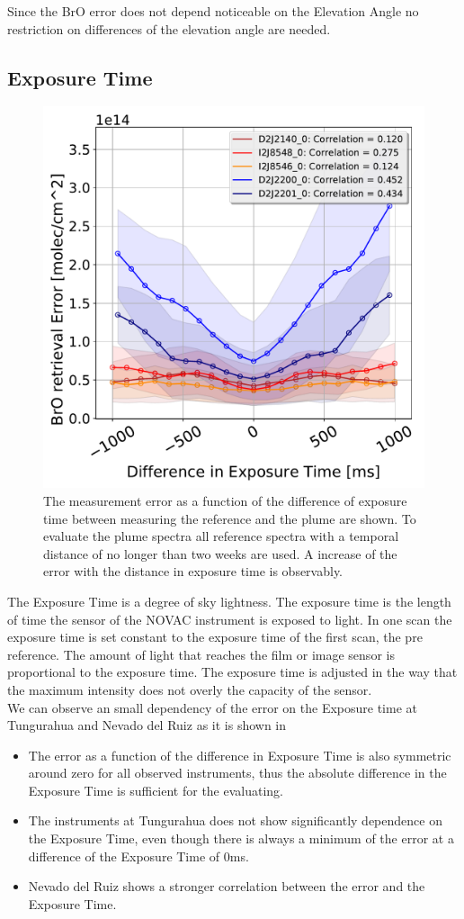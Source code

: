 Since the BrO error does not depend noticeable on the Elevation Angle no restriction on differences of the elevation angle are needed.
\subsection{Exposure Time}
\begin{figure}
	\centering
	\includegraphics[width=0.7\linewidth]{Bilder/DiffExpTimeallInstruments}
	\caption{The   measurement error as a function of the difference of exposure time between measuring the reference and the plume are shown. To evaluate the plume spectra all reference spectra with a temporal distance of no longer than two weeks are used. A increase of the  error with the distance in exposure time is observably.}
	\label{fig:diffexptime}
\end{figure}
The Exposure Time is a degree of sky lightness. The  exposure time is the length of time the sensor of the NOVAC instrument is exposed to light. In one scan the exposure time is set constant to the exposure time of the first scan, the pre reference. The amount of light that reaches the film or image sensor is proportional to the exposure time. The exposure time is adjusted in the way that the maximum intensity does not overly the capacity of the sensor.\\
We can observe an small dependency of the  error on the Exposure time at Tungurahua and Nevado del Ruiz as it is shown in 
\begin{itemize}
	\item The   error as a function of the difference in Exposure Time is also symmetric around zero for all observed instruments, thus the absolute difference in the Exposure Time is sufficient for the evaluating.
	\item The instruments at Tungurahua does not show significantly dependence on the Exposure Time, even though there is always a minimum of the  error at a difference of the Exposure Time of 0ms.
	\item Nevado del Ruiz shows a stronger correlation between the   error and the Exposure Time.
\end{itemize}
